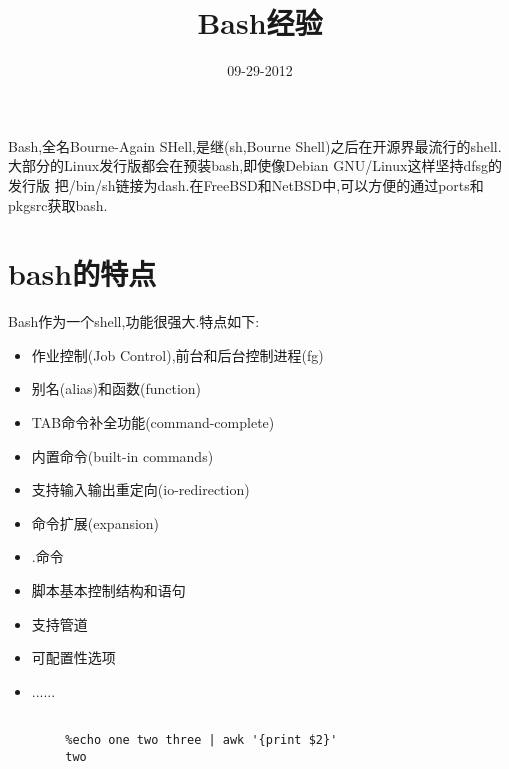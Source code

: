 
\title{Bash经验}

\date{09-29-2012}


\maketitle

Bash,全名Bourne-Again SHell,是继(sh,Bourne Shell)之后在开源界最流行的shell.
大部分的Linux发行版都会在预装bash,即使像Debian GNU/Linux这样坚持dfsg的发行版
把/bin/sh链接为dash.在FreeBSD和NetBSD中,可以方便的通过ports和pkgsrc获取bash.

\section{bash的特点}

Bash作为一个shell,功能很强大.特点如下:\\

\begin{itemize}
\item{作业控制(Job Control),前台和后台控制进程(fg)}
\item{别名(alias)和函数(function)}
\item{TAB命令补全功能(command-complete)}
\item{内置命令(built-in commands)}
\item{支持输入输出重定向(io-redirection)}
\item{命令扩展(expansion)}
\item{.命令}
\item{脚本基本控制结构和语句}
\item{支持管道}
\item{可配置性选项}
\item{......}
\end{itemize}
                



\begin{lstlisting}[title={简单例子},abovecaptionskip=0.5cm]

        %echo one two three | awk '{print $2}'
        two
\end{lstlisting}







